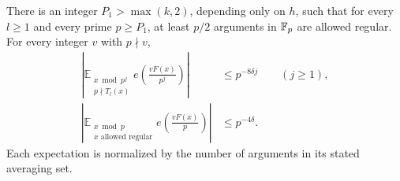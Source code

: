\begin{lemma}\label{lem:local-sums}
There is an integer $P_1>\max(k,2)$, depending only on $h$, such that for
every $l\ge1$ and every prime $p\ge P_1$, at least $p/2$ arguments in
$\mathbb F_p$ are allowed regular.  For every integer $v$ with $p\nmid v$,
\begin{equation}\label{eq:local-sums}
 \begin{split}
 \left|\mathbb E_{\substack{x\bmod p^j\\p\nmid T_l(x)}}
 e\left(\frac{vF(x)}{p^j}\right)\right|
 &\le p^{-8\delta j} \qquad(j\ge1),\\
 \left|\mathbb E_{\substack{x\bmod p\\x\text{ allowed regular}}}
 e\left(\frac{vF(x)}p\right)\right|
 &\le p^{-4\delta}.
 \end{split}
\end{equation}
Each expectation is normalized by the number of arguments in its stated
averaging set.
\end{lemma}


